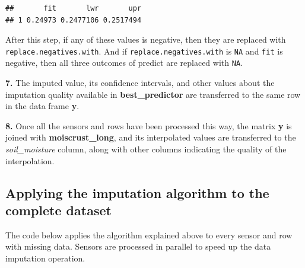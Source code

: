\documentclass[
  table]{article}
\begin{document}
\begin{verbatim}
##       fit       lwr       upr
## 1 0.24973 0.2477106 0.2517494
\end{verbatim}

After this step, if any of these values is negative, then they are
replaced with \texttt{replace.negatives.with}. And if
\texttt{replace.negatives.with} is \texttt{NA} and \texttt{fit} is
negative, then all three outcomes of predict are replaced with
\texttt{NA}.

\textbf{7.} The imputed value, its confidence intervals, and other
values about the imputation quality available in
\textbf{best\_predictor} are transferred to the same row in the data
frame \textbf{y}.

\textbf{8.} Once all the sensors and rows have been processed this way,
the matrix \textbf{y} is joined with \textbf{moiscrust\_long}, and its
interpolated values are transferred to the \emph{soil\_moisture} column,
along with other columns indicating the quality of the interpolation.

\hypertarget{applying-the-imputation-algorithm-to-the-complete-dataset}{%
\subsection{Applying the imputation algorithm to the complete
dataset}\label{applying-the-imputation-algorithm-to-the-complete-dataset}}

The code below applies the algorithm explained above to every sensor and
row with missing data. Sensors are processed in parallel to speed up the
data imputation operation.
\end{document}
